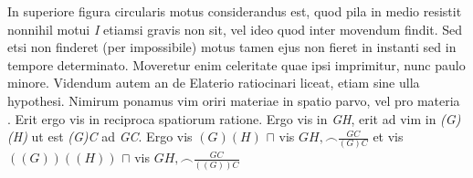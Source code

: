                      \pend
                      \pstart  
                      In superiore figura circularis motus considerandus est, quod pila\protect{} in medio resistit nonnihil motui \textit{I} etiamsi gravis non sit, vel ideo quod inter movendum findit. Sed etsi non finderet (per impossibile) motus tamen ejus non fieret in instanti sed in tempore determinato. Moveretur enim celeritate\protect{} quae ipsi imprimitur, nunc paulo minore.
                      \pend 
                      \pstart Videndum autem an de Elaterio\protect{} ratiocinari liceat, etiam sine ulla hypothesi. Nimirum ponamus vim oriri  materiae in spatio parvo, vel 
 pro materia . Erit ergo vis in reciproca spatiorum ratione. Ergo vis in \textit{GH}, erit ad vim in \textit{(G)(H)} ut est \textit{(G)C} ad \textit{GC}. Ergo vis  $\displaystyle (G)(H)$ $\sqcap$ vis $\displaystyle GH, \smallfrown \frac{GC}{(G)C}$ %
                     et  vis  $\displaystyle((G))((H))$ $\sqcap$ vis $\displaystyle GH, \smallfrown \frac{GC}{((G))C}$%
